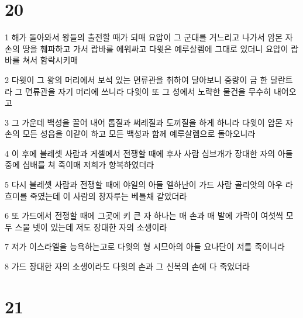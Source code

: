 \chapter{20}

\par 1 해가 돌아와서 왕들의 출전할 때가 되매 요압이 그 군대를 거느리고 나가서 암몬 자손의 땅을 훼파하고 가서 랍바를 에워싸고 다윗은 예루살렘에 그대로 있더니 요압이 랍바를 쳐서 함락시키매
\par 2 다윗이 그 왕의 머리에서 보석 있는 면류관을 취하여 달아보니 중량이 금 한 달란트라 그 면류관을 자기 머리에 쓰니라 다윗이 또 그 성에서 노략한 물건을 무수히 내어오고
\par 3 그 가운데 백성을 끌어 내어 톱질과 써레질과 도끼질을 하게 하니라 다윗이 암몬 자손의 모든 성읍을 이같이 하고 모든 백성과 함께 예루살렘으로 돌아오니라
\par 4 이 후에 블레셋 사람과 게셀에서 전쟁할 때에 후사 사람 십브개가 장대한 자의 아들 중에 십배를 쳐 죽이매 저희가 항복하였더라
\par 5 다시 블레셋 사람과 전쟁할 때에 야일의 아들 엘하난이 가드 사람 골리앗의 아우 라흐미를 죽였는데 이 사람의 창자루는 베틀채 같았더라
\par 6 또 가드에서 전쟁할 때에 그곳에 키 큰 자 하나는 매 손과 매 발에 가락이 여섯씩 모두 스물 넷이 있는데 저도 장대한 자의 소생이라
\par 7 저가 이스라엘을 능욕하는고로 다윗의 형 시므아의 아들 요나단이 저를 죽이니라
\par 8 가드 장대한 자의 소생이라도 다윗의 손과 그 신복의 손에 다 죽었더라

\chapter{21}

